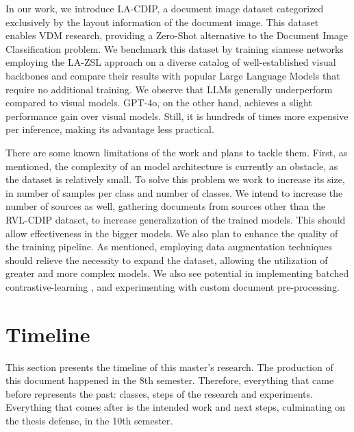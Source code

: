 In our work, we introduce \gls{LA-CDIP}, a document image dataset categorized exclusively by the layout information of the document image. This dataset enables \gls{VDM} research, providing a Zero-Shot alternative to the Document Image Classification problem. We benchmark this dataset by training siamese networks employing the \gls{LA-ZSL} approach on a diverse catalog of well-established visual backbones and compare their results with popular Large Language Models that require no additional training. We observe that \glspl{LLM} generally underperform compared to visual models. GPT-4o, on the other hand, achieves a slight performance gain over visual models. Still, it is hundreds of times more expensive per inference, making its advantage less practical.

There are some known limitations of the work and plans to tackle them. First, as mentioned, the complexity of an model architecture is currently an obstacle, as the dataset is relatively small. To solve this problem we work to increase its size, in number of samples per class and number of classes. We intend to increase the number of sources as well, gathering documents from sources other than the RVL-CDIP dataset, to increase generalization of  the trained models. This should allow effectiveness in the bigger models. We also plan to enhance the quality of the training pipeline. As mentioned, employing data augmentation techniques should relieve the necessity to expand the dataset, allowing the utilization of greater and more complex models. We also see potential in implementing batched contrastive-learning \cite{yang_batchsampler_2023}, and experimenting with custom document pre-processing.

\section{Timeline}

This section presents the timeline of this master's research. The production of this document happened in the 8th semester. Therefore, everything that came before represents the past: classes, steps of the research and experiments. Everything that comes after is the intended work and next steps, culminating on the thesis defense, in the 10th semester.

